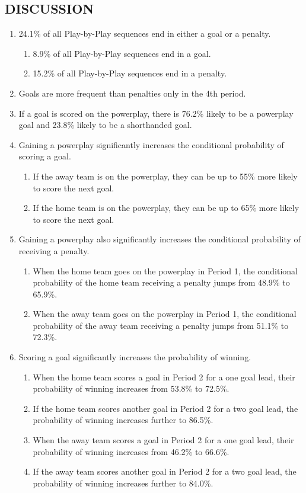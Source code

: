 \documentclass[]{article}
\begin{document}
\subsection{DISCUSSION}

\begin{enumerate}
\item 24.1\% of all Play-by-Play sequences end in either a goal or a penalty.
\begin{enumerate}
\item 8.9\% of all Play-by-Play sequences end in a goal.
\item 15.2\% of all Play-by-Play sequences end in a penalty.
\end{enumerate}
\item Goals are more frequent than penalties only in the 4th period.
\item If a goal is scored on the powerplay, there is 76.2\% likely to be a powerplay goal and 23.8\% likely to be a shorthanded goal.
\item Gaining a powerplay significantly increases the conditional probability of scoring a goal.
\begin{enumerate}
\item If the away team is on the powerplay, they can be up to 55\% more likely to score the next goal.
\item If the home team is on the powerplay, they can be up to 65\% more likely to score the next goal.
\end{enumerate}
\item Gaining a powerplay also significantly increases the conditional probability of receiving a penalty.
\begin{enumerate}
\item When the home team goes on the powerplay in Period 1, the conditional probability of the home team receiving a penalty jumps from 48.9\% to 65.9\%.
\item When the away team goes on the powerplay in Period 1, the conditional probability of the away team receiving a penalty jumps from 51.1\% to 72.3\%.
\end{enumerate}
\item Scoring a goal significantly increases the probability of winning.
\begin{enumerate}
\item When the home team scores a goal in Period 2 for a one goal lead, their probability of winning increases from 53.8\% to 72.5\%.
\item If the home team scores another goal in Period 2 for a two goal lead, the probability of winning increases further to 86.5\%.
\item When the away team scores a goal in Period 2 for a one goal lead, their probability of winning increases from 46.2\% to 66.6\%.
\item If the away team scores another goal in Period 2 for a two goal lead, the probability of winning increases further to 84.0\%.
\end{enumerate}
\end{enumerate}
\end{document}
